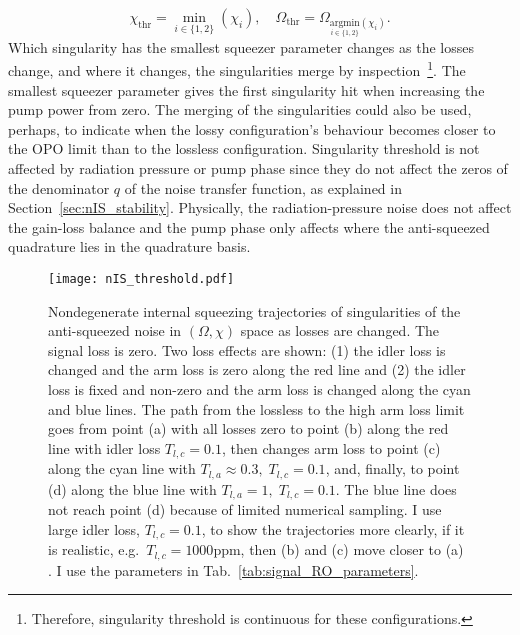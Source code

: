 \begin{equation}
\chi_\text{thr}=\min_{i\in\{1,2\}}(\chi_i),\quad\Omega_\text{thr}=\Omega_{\underset{i\in\{1,2\}}{\text{argmin}}(\chi_i)}.
\end{equation}
Which singularity has the smallest squeezer parameter changes as the losses change, and where it changes, the singularities merge by inspection~\footnote{Therefore, singularity threshold is continuous for these configurations.}. The smallest squeezer parameter gives the first singularity hit when increasing the pump power from zero. The merging of the singularities could also be used, perhaps, to indicate when the lossy configuration's behaviour becomes closer to the OPO limit than to the lossless configuration.
Singularity threshold is not affected by radiation pressure or pump phase since they do not affect the zeros of the denominator $q$ of the noise transfer function, as explained in Section~\ref{sec:nIS_stability}. Physically, the radiation-pressure noise does not affect the gain-loss balance and the pump phase only affects where the anti-squeezed quadrature lies in the quadrature basis.

\begin{figure}
    \centering
    \texttt{[image: nIS\_threshold.pdf]}
    \caption{ Nondegenerate internal squeezing trajectories of singularities of the anti-squeezed noise in $(\Omega, \chi)$ space as losses are changed. The signal loss is zero. Two loss effects are shown: (1) the idler loss is changed and the arm loss is zero along the red line and (2) the idler loss is fixed and non-zero and the arm loss is changed along the cyan and blue lines. 
    The path from the lossless to the high arm loss limit goes from point (a) with all losses zero to point (b) along the red line with idler loss $T_{l,c}=0.1$, then changes arm loss to point (c) along the cyan line with $T_{l,a}\approx0.3,\;T_{l,c}=0.1$, and, finally, to point (d) along the blue line with $T_{l,a}=1,\;T_{l,c}=0.1$. The blue line does not reach point (d) because of limited numerical sampling.
    I use large idler loss, $T_{l,c}=0.1$, to show the trajectories more clearly, if it is realistic, e.g.\ $T_{l,c}=1000\text{ppm}$, then (b) and (c) move closer to (a) . I use the parameters in Tab.~\ref{tab:signal_RO_parameters}.}
    \label{fig:nIS_threshold_traj}
\end{figure}

